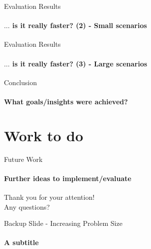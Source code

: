 \documentclass[
	english,%
	aspectratio=169,%
	color={accentcolor=1b},
	logo=true,%
	colorframetitle=true,%
	authorontitle=true,
	usepdftitle=false,
	]{tudabeamer}
\begin{document}
\begin{frame}{Evaluation Results}
	\framesubtitle{$\ldots$ is it really faster? (2) - Small scenarios}
	\label{results-1}
	
\end{frame}

\begin{frame}{Evaluation Results}
	\framesubtitle{$\ldots$ is it really faster? (3) - Large scenarios}
	\label{results-2}
	
	\end{frame}

\begin{frame}[fragile]{Conclusion}
	\framesubtitle{What goals/insights were achieved?}
	\label{conclusion}
	
\end{frame}

\section{Work to do}

\begin{frame}{Future Work}
	\framesubtitle{Further ideas to implement/evaluate}
	\label{future-work}
	\vspace{2em}
	
\end{frame}

\begin{frame}[c]{}
	\label{thank-you}
	\centering
	\vspace{3em}
	\LARGE
	Thank you for your attention!\\
	Any questions?
\end{frame}

%
%

\begin{frame}{Backup Slide - Increasing Problem Size}
	\framesubtitle{A subtitle}
	\label{problem-size}
	
\end{frame}
\end{document}
